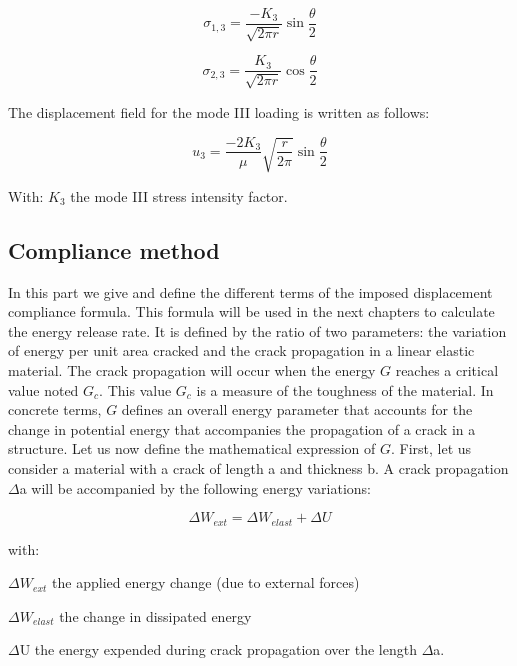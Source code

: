\begin{equation}
	\sigma_{1,3} = \frac{-K_{3}}{\sqrt{2 \pi r}} \sin{\frac{\theta}{2}}
	\label{eq:eq118}
\end{equation}

\begin{equation}
	\sigma_{2,3} = \frac{K_{3}}{\sqrt{2 \pi r}} \cos{\frac{\theta}{2}}
	\label{eq:eq119}
\end{equation}

The displacement field for the mode III loading is written as follows:

\begin{equation}
	u_{3} = \frac{-2 K_{3}}{\mu} \sqrt{\frac{r}{2 \pi}} \sin{\frac{\theta}{2}}
	\label{eq:eq120}
\end{equation}

With: $K_3$  the mode III stress intensity factor.

\subsection{Compliance method}

In this part we give and define the different terms of the imposed displacement compliance formula. This formula will be used in the next chapters to calculate the energy release rate. It is defined by the ratio of two parameters: the variation of energy per unit area cracked and the crack propagation in a linear elastic material. The crack propagation will occur when the energy $G$ reaches a critical value noted $G_c$. This value $G_c$ is a measure of the toughness of the material. In concrete terms, $G$ defines an overall energy parameter that accounts for the change in potential energy that accompanies the propagation of a crack in a structure. Let us now define the mathematical expression of $G$. First, let us consider a material with a crack of length a and thickness b. A crack propagation $\Delta$a will be accompanied by the following energy variations:

\begin{equation}
	\Delta W_{ext}=\Delta W_{elast}+\Delta U
	\label{eq:eq121}
\end{equation}

\noindent with:

$\Delta W_{ext}$ the applied energy change (due to external forces)

$\Delta W_{elast}$ the change in dissipated energy 

$\Delta$U the energy expended during crack propagation over the length $\Delta$a.

